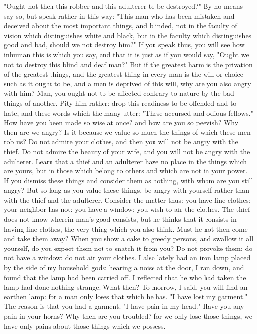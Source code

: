 \documentclass[a4paper]{article}
\begin{document}
"Ought not then this robber and this adulterer to be destroyed?" By
no means say so, but speak rather in this way: "This man who has been
mistaken and deceived about the most important things, and blinded,
not in the faculty of vision which distinguishes white and black,
but in the faculty which distinguishes good and bad, should we not
destroy him?" If you speak thus, you will see how inhuman this is
which you say, and that it is just as if you would say, "Ought we
not to destroy this blind and deaf man?" But if the greatest harm
is the privation of the greatest things, and the greatest thing in
every man is the will or choice such as it ought to be, and a man
is deprived of this will, why are you also angry with him? Man, you
ought not to be affected contrary to nature by the bad things of another.
Pity him rather: drop this readiness to be offended and to hate, and
these words which the many utter: "These accursed and odious fellows."
How have you been made so wise at once? and how are you so peevish?
Why then are we angry? Is it because we value so much the things of
which these men rob us? Do not admire your clothes, and then you will
not be angry with the thief. Do not admire the beauty of your wife,
and you will not be angry with the adulterer. Learn that a thief and
an adulterer have no place in the things which are yours, but in those
which belong to others and which are not in your power. If you dismiss
these things and consider them as nothing, with whom are you still
angry? But so long as you value these things, be angry with yourself
rather than with the thief and the adulterer. Consider the matter
thus: you have fine clothes; your neighbor has not: you have a window;
you wish to air the clothes. The thief does not know wherein man's
good consists, but he thinks that it consists in having fine clothes,
the very thing which you also think. Must he not then come and take
them away? When you show a cake to greedy persons, and swallow it
all yourself, do you expect them not to snatch it from you? Do not
provoke them: do not have a window: do not air your clothes. I also
lately had an iron lamp placed by the side of my household gods: hearing
a noise at the door, I ran down, and found that the lamp had been
carried off. I reflected that he who had taken the lamp had done nothing
strange. What then? To-morrow, I said, you will find an earthen lamp:
for a man only loses that which he has. "I have lost my garment."
The reason is that you had a garment. "I have pain in my head." Have
you any pain in your horns? Why then are you troubled? for we only
lose those things, we have only pains about those things which we
possess. 
\end{document}
